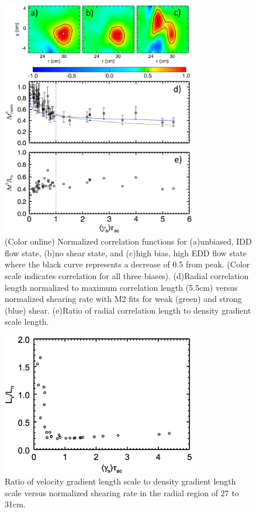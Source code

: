 \documentclass[aip,pop,amsmath,amssymb,preprint,superscriptaddress]{revtex4-1} %
\begin{document}
\begin{figure}[!htbp]
\centerline{
\includegraphics[width=8.5cm]{figure6.eps}}
\caption{\label{fig:radcorr} (Color online) Normalized correlation functions for (a)unbiased, IDD flow state, (b)no shear state, and (c)high bias, high EDD flow state where the black curve represents a decrease of 0.5 from peak. (Color scale indicates correlation for all three biases). (d)Radial correlation length normalized to maximum correlation length (5.5cm) versus normalized shearing rate with M2 fits for weak (green) and strong (blue) shear. (e)Ratio of radial correlation length to density gradient scale length.}
\end{figure}

\begin{figure}[!htbp]
\centerline{
\includegraphics[width=8.5cm]{figure7.eps}}
\caption{\label{fig:LgammaLn} Ratio of velocity gradient length scale
  to density gradient length scale versus normalized shearing rate in the radial region of 27 to 31cm.}
\end{figure}
\end{document}

